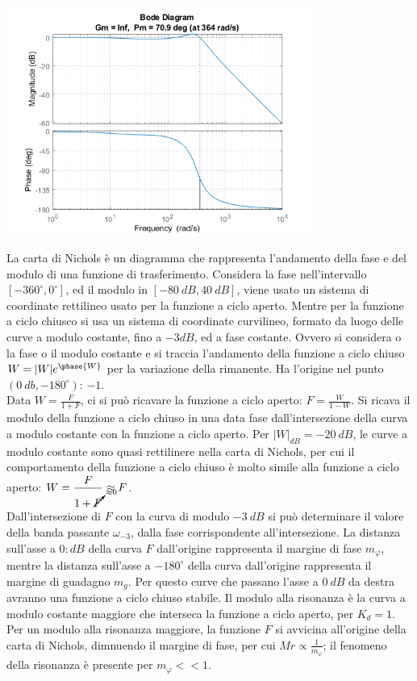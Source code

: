 \documentclass{article}
\numberwithin{equation}{subsection}
\begin{document}
\begin{center}
    \includegraphics[width=10cm]{Bode3.png}
\end{center}

La carta di Nichols è un diagramma che rappresenta l'andamento della fase e del modulo di una funzione di trasferimento. Considera la fase nell'intervallo 
$[-360^{\circ},0^{\circ}]$, ed il modulo in $[-80\:dB, 40\:dB]$, viene usato un sistema di coordinate rettilineo usato per la funzione a ciclo aperto. Mentre per la funzione 
a ciclo chiusco si usa un sistema di coordinate curvilineo, formato da luogo delle curve a modulo costante, fino a $-3dB$, ed a fase costante. Ovvero si considera o la fase 
o il modulo costante e si traccia l'andamento della funzione a ciclo chiuso $W=|W|e^{\phase{W}}$ per la variazione della rimanente. Ha l'origine nel punto 
$(0\:db,-180^{\circ})$: $-1$. \\

Data $W=\displaystyle\frac{F}{1+F}$, ci si può ricavare la funzione a ciclo aperto: $F=\displaystyle\frac{W}{1-W}$. Si ricava il modulo della funzione a ciclo chiuso in 
una data fase dall'intersezione della curva a modulo costante con la funzione a ciclo aperto. Per $|W|_{dB}=-20\:dB$, le curve a modulo costante sono quasi rettilinere nella 
carta di Nichols, per cui il comportamento della funzione a ciclo chiuso è molto simile alla funzione a ciclo aperto: 
$W=\displaystyle\frac{F}{1+\cancelto{\approx0}{F}}\approx F$. \\

Dall'intersezione di $F$ con la curva di modulo $-3\:dB$ si può determinare il valore della banda passante $\omega_{-3}$, dalla fase corrispondente all'intersezione. La 
distanza sull'asse a $0:dB$ della curva $F$ dall'origine rappresenta il margine di fase $m_{\varphi}$, mentre la distanza sull'asse a $-180^{\circ}$ della curva dall'origine 
rappresenta il margine di guadagno $m_g$. Per questo curve che passano l'asse a $0\:dB$ da destra avranno una funzione a ciclo chiuso stabile. Il modulo alla risonanza è la 
curva a modulo costante maggiore che interseca la funzione a ciclo aperto, per $K_d=1$. Per un modulo alla risonanza maggiore, la funzione $F$ si avvicina all'origine della 
carta di Nichols, dimnuendo il margine di fase, per cui $Mr\propto\displaystyle\frac{1}{m_{\varphi}}$; il fenomeno della risonanza è presente per $m_{\varphi}<<1$. 
\end{document}
